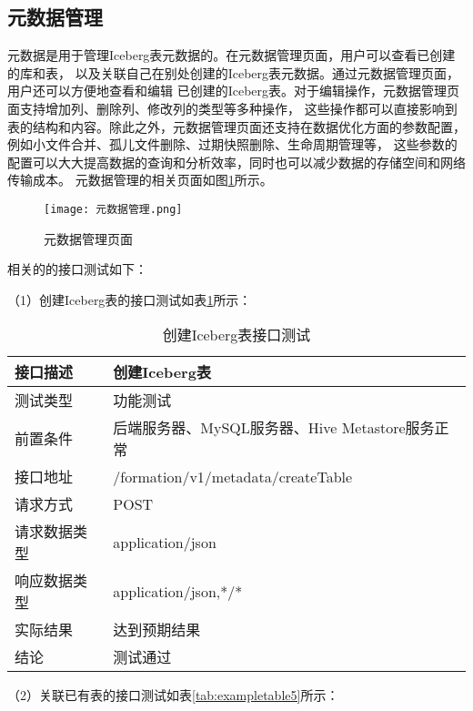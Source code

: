 \subsection{元数据管理}

元数据是用于管理Iceberg表元数据的。在元数据管理页面，用户可以查看已创建的库和表，
以及关联自己在别处创建的Iceberg表元数据。通过元数据管理页面，用户还可以方便地查看和编辑
已创建的Iceberg表。对于编辑操作，元数据管理页面支持增加列、删除列、修改列的类型等多种操作，
这些操作都可以直接影响到表的结构和内容。除此之外，元数据管理页面还支持在数据优化方面的参数配置，
例如小文件合并、孤儿文件删除、过期快照删除、生命周期管理等，
这些参数的配置可以大大提高数据的查询和分析效率，同时也可以减少数据的存储空间和网络传输成本。
元数据管理的相关页面如图\ref{fig:元数据管理}所示。

\begin{figure}[H]
  \centering
  \texttt{[image: 元数据管理.png]}
  \caption{元数据管理页面}
  \label{fig:元数据管理}
\end{figure}

相关的的接口测试如下：

（1）创建Iceberg表的接口测试如表\ref{tab:exampletable4}所示：

\begin{table}[H]
  \centering
  \caption{创建Iceberg表接口测试}
  \label{tab:exampletable4}
  \begin{tabular}{ll}
    \toprule
    接口描述         & 创建Iceberg表         \\
    \midrule
    测试类型         & 功能测试         \\
    前置条件         & 后端服务器、MySQL服务器、Hive Metastore服务正常         \\
    接口地址       & /formation/v1/metadata/createTable        \\
    请求方式         & POST      \\
    请求数据类型         & application/json     \\
    响应数据类型         & application/json,*/*           \\
    实际结果         & 达到预期结果           \\
    结论            & 测试通过           \\
    \bottomrule
  \end{tabular}
\end{table}

（2）关联已有表的接口测试如表\ref{tab:exampletable5}所示：


